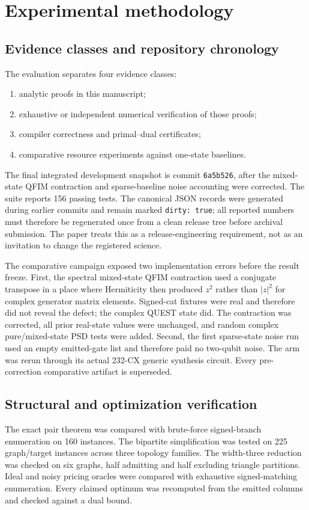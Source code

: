 \documentclass[11pt]{article}
\theoremstyle{definition}
\theoremstyle{remark}
\begin{document}
\section{Experimental methodology}
\label{sec:methodology}

\subsection{Evidence classes and repository chronology}
The evaluation separates four evidence classes:
\begin{enumerate}[label=(\roman*)]
  \item analytic proofs in this manuscript;
  \item exhaustive or independent numerical verification of those proofs;
  \item compiler correctness and primal--dual certificates;
  \item comparative resource experiments against one-state baselines.
\end{enumerate}
The final integrated development snapshot is commit \texttt{6a5b526}, after the mixed-state QFIM contraction and sparse-baseline noise accounting were corrected. The suite reports 156 passing tests. The canonical JSON records were generated during earlier commits and remain marked \texttt{dirty: true}; all reported numbers must therefore be regenerated once from a clean release tree before archival submission. The paper treats this as a release-engineering requirement, not as an invitation to change the registered science.


The comparative campaign exposed two implementation errors before the result freeze. First, the spectral mixed-state QFIM contraction used a conjugate transpose in a place where Hermiticity then produced $z^2$ rather than $|z|^2$ for complex generator matrix elements. Signed-cat fixtures were real and therefore did not reveal the defect; the complex QUEST state did. The contraction was corrected, all prior real-state values were unchanged, and random complex pure/mixed-state PSD tests were added. Second, the first sparse-state noise run used an empty emitted-gate list and therefore paid no two-qubit noise. The arm was rerun through its actual 232-CX generic synthesis circuit. Every pre-correction comparative artifact is superseded.

\subsection{Structural and optimization verification}
The exact pair theorem was compared with brute-force signed-branch enumeration on 160 instances. The bipartite simplification was tested on 225 graph/target instances across three topology families. The width-three reduction was checked on six graphs, half admitting and half excluding triangle partitions. Ideal and noisy pricing oracles were compared with exhaustive signed-matching enumeration. Every claimed optimum was recomputed from the emitted columns and checked against a dual bound.
\end{document}

